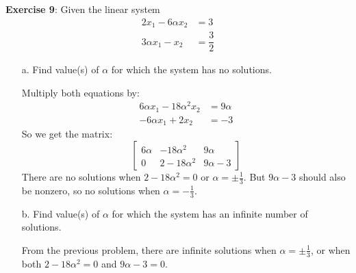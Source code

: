 \documentclass{article}
\begin{document}
\textbf{Exercise 9}: Given the linear system
    \begin{align*}
        2x_{1} - 6 \alpha x_{2} &= 3            \\
        3\alpha x_{1} - x_{2}   &= \dfrac{3}{2}   
    \end{align*}
    \begin{itemize}
        \item [a.] Find value(s) of $\alpha$ for which the system has no solutions.
            \begin{answer}
                Multiply both equations by:
                    \begin{align*}
                        6\alpha x_{1} - 18\alpha^{2} x_{2} &= 9\alpha \\
                        -6\alpha x_{1} + 2x_{2}             &= -3         
                    \end{align*}
                So we get the matrix:
                    \begin{equation*}
                        \begin{bmatrix}
                            6\alpha & -18\alpha^{2} & 9\alpha \\
                            0       & 2 -18\alpha^{2}      & 9\alpha - 3
                        \end{bmatrix}
                    \end{equation*}
                There are no solutions when $2 - 18\alpha^{2} = 0$ or $\alpha = \pm \frac{1}{3}$. But $9\alpha - 3$ should also be nonzero, so no solutions when $\alpha = -\frac{1}{3}$.
            \end{answer}

        \item [b.] Find value(s) of $\alpha$ for which the system has an infinite number of solutions.
            \begin{answer}
                From the previous problem, there are infinite solutions when $\alpha = \pm \frac{1}{3}$, or when both $2 - 18\alpha^{2} = 0$ and $9\alpha - 3 = 0$.
            \end{answer}


\end{itemize}
\end{document}
